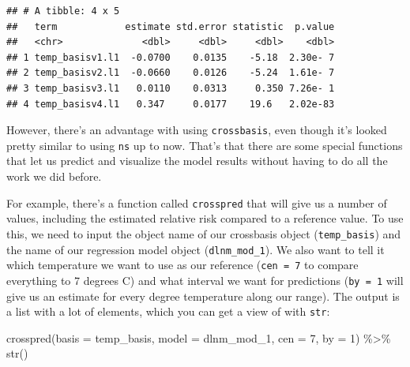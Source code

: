\documentclass[
]{book}
\newenvironment{Shaded}{\begin{snugshade}}{\end{snugshade}}
\newcommand{\AttributeTok}[1]{\textcolor[rgb]{0.77,0.63,0.00}{#1}}
\newcommand{\DecValTok}[1]{\textcolor[rgb]{0.00,0.00,0.81}{#1}}
\newcommand{\FunctionTok}[1]{\textcolor[rgb]{0.00,0.00,0.00}{#1}}
\newcommand{\NormalTok}[1]{#1}
\newcommand{\SpecialCharTok}[1]{\textcolor[rgb]{0.00,0.00,0.00}{#1}}
\begin{document}
\begin{verbatim}
## # A tibble: 4 x 5
##   term            estimate std.error statistic  p.value
##   <chr>              <dbl>     <dbl>     <dbl>    <dbl>
## 1 temp_basisv1.l1  -0.0700    0.0135    -5.18  2.30e- 7
## 2 temp_basisv2.l1  -0.0660    0.0126    -5.24  1.61e- 7
## 3 temp_basisv3.l1   0.0110    0.0313     0.350 7.26e- 1
## 4 temp_basisv4.l1   0.347     0.0177    19.6   2.02e-83
\end{verbatim}

However, there's an advantage with using \texttt{crossbasis}, even though it's looked pretty similar
to using \texttt{ns} up to now. That's that there are some special functions that let us predict
and visualize the model results without having to do all the work we did before.

For example, there's a function called \texttt{crosspred} that will give us a number of values,
including the estimated relative risk compared to a reference value. To use this, we
need to input the object name of our crossbasis object (\texttt{temp\_basis}) and the name of our
regression model object (\texttt{dlnm\_mod\_1}). We also want to tell it which temperature we want
to use as our reference (\texttt{cen\ =\ 7} to compare everything to 7 degrees C) and what interval
we want for predictions (\texttt{by\ =\ 1} will give us an estimate for every degree temperature
along our range). The output is a list with a lot of elements, which you can get a view of
with \texttt{str}:

\begin{Shaded}
\begin{Highlighting}[]
\FunctionTok{crosspred}\NormalTok{(}\AttributeTok{basis =}\NormalTok{ temp\_basis, }\AttributeTok{model =}\NormalTok{ dlnm\_mod\_1, }\AttributeTok{cen =} \DecValTok{7}\NormalTok{, }\AttributeTok{by =} \DecValTok{1}\NormalTok{) }\SpecialCharTok{\%\textgreater{}\%} 
  \FunctionTok{str}\NormalTok{()}
\end{Highlighting}
\end{Shaded}
\end{document}
